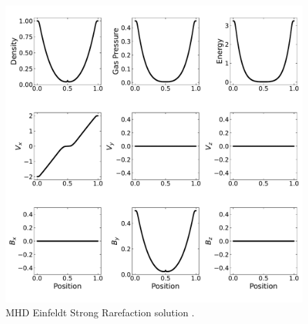 \begin{figure}[ht!]
    \includegraphics[width=\linewidth]{assets/3-mhd-tests/einfeldt.pdf}
    \caption{MHD Einfeldt Strong Rarefaction solution \citep{einfeldt_1991}.
    }
    \label{fig:einfeldt}
\end{figure}